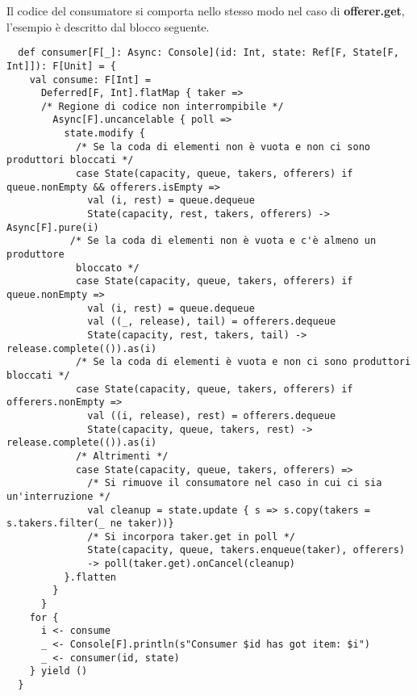 \noindent Il codice del consumatore si comporta nello stesso modo nel caso di \textbf{offerer.get}, l'esempio è descritto dal blocco seguente.
\begin{verbatim}
  def consumer[F[_]: Async: Console](id: Int, state: Ref[F, State[F, Int]]): F[Unit] = {
    val consume: F[Int] =
      Deferred[F, Int].flatMap { taker =>
      /* Regione di codice non interrompibile */
        Async[F].uncancelable { poll =>
          state.modify {
            /* Se la coda di elementi non è vuota e non ci sono produttori bloccati */
            case State(capacity, queue, takers, offerers) if queue.nonEmpty && offerers.isEmpty =>
              val (i, rest) = queue.dequeue
              State(capacity, rest, takers, offerers) -> Async[F].pure(i)
           /* Se la coda di elementi non è vuota e c'è almeno un produttore
            bloccato */
            case State(capacity, queue, takers, offerers) if queue.nonEmpty =>
              val (i, rest) = queue.dequeue
              val ((_, release), tail) = offerers.dequeue
              State(capacity, rest, takers, tail) -> release.complete(()).as(i)
            /* Se la coda di elementi è vuota e non ci sono produttori bloccati */
            case State(capacity, queue, takers, offerers) if offerers.nonEmpty =>
              val ((i, release), rest) = offerers.dequeue
              State(capacity, queue, takers, rest) -> release.complete(()).as(i)
            /* Altrimenti */
            case State(capacity, queue, takers, offerers) =>
              /* Si rimuove il consumatore nel caso in cui ci sia un'interruzione */
              val cleanup = state.update { s => s.copy(takers = s.takers.filter(_ ne taker))}
              /* Si incorpora taker.get in poll */
              State(capacity, queue, takers.enqueue(taker), offerers)
              -> poll(taker.get).onCancel(cleanup)
          }.flatten
        }
      }
    for {
      i <- consume
      _ <- Console[F].println(s"Consumer $id has got item: $i")
      _ <- consumer(id, state)
    } yield ()
  }

    
\end{verbatim}
